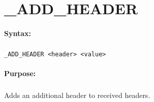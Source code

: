 
\newpage
\section{\_ADD\_HEADER}
\label{cmd:_ADD_HEADER}

\paragraph{Syntax:}
\subparagraph{}
\texttt{\_ADD\_HEADER <header> <value>}

\paragraph{Purpose:}
\subparagraph{}
Adds an additional header to received headers.

